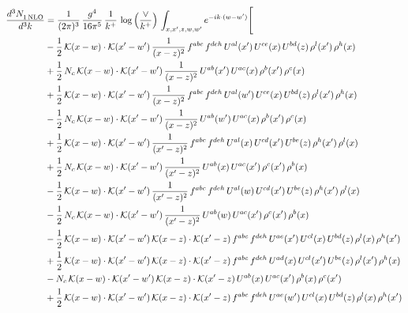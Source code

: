 \documentclass[9pt]{article}
\numberwithin{equation}{section}
\begin{document}
\begin{align}
\frac{d^{3}N_{1\,\rm NLO}^{\rm}}{d^{3}k}  & = \frac{1}{(2\pi)^{3}}\,\frac{g^{4}}{16\pi^{5}}\,\frac{1}{k^{+}}\,\log{\left(\frac{\vee}{k^{+}}\right)}\, \int_{x,x',z,w,w'}e^{-ik\cdot (w-w')}\Bigg[\notag\\ & -\frac{1}{2}\,\mathcal{K}(x-w)\cdot\mathcal{K}(x'-w')\,\frac{1}{(x-z)^{2}}\,f^{abc}\,f^{deh}\,U^{al}(x')\,U^{ce}(x)\,U^{bd}(z)\,\rho^{l}(x')\,\rho^{h}(x)\notag\\
&+\frac{1}{2}\,N_{c}\,\mathcal{K}(x-w)\cdot\mathcal{K}(x'-w')\,\frac{1}{(x-z)^{2}}\,U^{ab}(x')\,U^{ac}(x)\,\rho^{b}(x')\,\rho^{c}(x)\notag\\
&+\frac{1}{2}\,\mathcal{K}(x-w)\cdot\mathcal{K}(x'-w')\,\frac{1}{(x-z)^{2}}\,f^{abc}\,f^{deh}\,U^{al}(w')\,U^{ce}(x)\,U^{bd}(z)\,\rho^{l}(x')\,\rho^{h}(x)\notag\\
&-\frac{1}{2}\,N_{c}\,\mathcal{K}(x-w)\cdot\mathcal{K}(x'-w')\,\frac{1}{(x-z)^{2}}\,U^{ab}(w')\,U^{ac}(x)\,\rho^{b}(x')\,\rho^{c}(x)\notag\\
&+\frac{1}{2}\,\mathcal{K}(x-w)\cdot\mathcal{K}(x'-w')\,\frac{1}{(x'-z)^{2}}\,f^{abc}\,f^{deh}\,U^{al}(x)\,U^{cd}(x')\,U^{be}(z)\,\rho^{h}(x')\,\rho^{l}(x)\notag\\
&+\frac{1}{2}\,N_{c}\,\mathcal{K}(x-w)\cdot\mathcal{K}(x'-w')\,\frac{1}{(x'-z)^{2}}\,U^{ab}(x)\,U^{ac}(x')\,\rho^{c}(x')\,\rho^{b}(x)\notag\\
&-\frac{1}{2}\,\mathcal{K}(x-w)\cdot\mathcal{K}(x'-w')\,\frac{1}{(x'-z)^{2}}\,f^{abc}\,f^{deh}\,U^{al}(w)\,U^{cd}(x')\,U^{be}(z)\,\rho^{h}(x')\,\rho^{l}(x)\notag\\
&-\frac{1}{2}\,N_{c}\,\mathcal{K}(x-w)\cdot\mathcal{K}(x'-w')\,\frac{1}{(x'-z)^{2}}\,U^{ab}(w)\,U^{ac}(x')\,\rho^{c}(x')\,\rho^{b}(x)\notag\\
&-\frac{1}{2}\,\mathcal{K}(x-w)\cdot\mathcal{K}(x'-w')\,\mathcal{K}(x-z)\cdot\mathcal{K}(x'-z)\,f^{abc}\,f^{deh}\,U^{ae}(x')\,U^{cl}(x)\,U^{bd}(z)\,\rho^{l}(x)\,\rho^{h}(x')\notag\\
&+\frac{1}{2}\,\mathcal{K}(x-w)\cdot\mathcal{K}(x'-w')\,\mathcal{K}(x-z)\cdot\mathcal{K}(x'-z)\,f^{abc}\,f^{deh}\,U^{ad}(x)\,U^{cl}(x')\,U^{be}(z)\,\rho^{l}(x')\,\rho^{h}(x)\notag\\
&-N_{c}\,\mathcal{K}(x-w)\cdot\mathcal{K}(x'-w')\,\mathcal{K}(x-z)\cdot\mathcal{K}(x'-z)\,U^{ab}(x)\,U^{ac}(x')\,\rho^{b}(x)\,\rho^{c}(x')\notag\\
&+\frac{1}{2}\,\mathcal{K}(x-w)\cdot\mathcal{K}(x'-w')\,\mathcal{K}(x-z)\cdot\mathcal{K}(x'-z)\,f^{abc}\,f^{deh}\,U^{ae}(w')\,U^{cl}(x)\,U^{bd}(z)\,\rho^{l}(x)\,\rho^{h}(x')\notag\\

\end{align}
\end{document}
